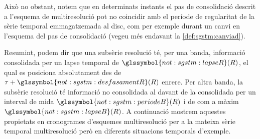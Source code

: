 Això no obstant, notem que en determinats instants el pas de
consolidació descrit a l'esquema de multiresolució pot no coincidir
amb el període de regularitat de la sèrie temporal emmagatzemada al
disc, com per exemple durant un canvi en l'esquema del pas de
consolidació (vegeu més endavant
la \autoref{def:sgstm:canviad}). 


Resumint, podem dir que una subsèrie resolució té, per una banda,
informació consolidada per un lapse temporal de
$\glssymbol{not:sgstm:lapseR}(R)$, el qual es posiciona absolutament
des de $\tau + \glssymbol{not:sgstm:desfasamentR}(R)$ enrere. Per
altra banda, la subsèrie resolució té informació no consolidada al
davant de la consolidada per un interval de mida
$\glssymbol{not:sgstm:periodeB}(R)$ i de com a màxim
$\glssymbol{not:sgstm:lapseB}(R)$. A continuació mostrem aquestes
propietats en cronogrames d'esquemes multiresolució per a la mateixa
sèrie temporal multiresolució però en diferents situacions temporals
d'exemple.



